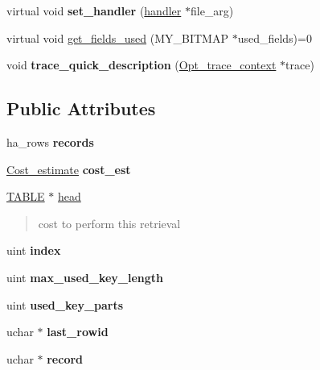 \begin{DoxyCompactItemize}
virtual void {\bfseries set\+\_\+handler} (\mbox{\hyperlink{classhandler}{handler}} $\ast$file\+\_\+arg)
\item 
virtual void \mbox{\hyperlink{classQUICK__SELECT__I_a369861adc70c029a3eb4134e8b7cce4f}{get\+\_\+fields\+\_\+used}} (M\+Y\+\_\+\+B\+I\+T\+M\+AP $\ast$used\+\_\+fields)=0
\item 
\mbox{\label{classQUICK__SELECT__I_a21e93e148e997f15a4708183118aaf48}} 
void {\bfseries trace\+\_\+quick\+\_\+description} (\mbox{\hyperlink{classOpt__trace__context}{Opt\+\_\+trace\+\_\+context}} $\ast$trace)
\end{DoxyCompactItemize}
\subsection*{Public Attributes}
\begin{DoxyCompactItemize}
\item 
\mbox{\label{classQUICK__SELECT__I_af94f0de82d880551e2ef9bf6b18f4947}} 
ha\+\_\+rows {\bfseries records}
\item 
\mbox{\label{classQUICK__SELECT__I_a8531d02b7cef8f9baf3ca77e3f292997}} 
\mbox{\hyperlink{classCost__estimate}{Cost\+\_\+estimate}} {\bfseries cost\+\_\+est}
\item 
\mbox{\label{classQUICK__SELECT__I_acea2f5e5b09be8e5b08680ae8a120481}} 
\mbox{\hyperlink{structTABLE}{T\+A\+B\+LE}} $\ast$ \mbox{\hyperlink{classQUICK__SELECT__I_acea2f5e5b09be8e5b08680ae8a120481}{head}}
\begin{DoxyCompactList}\small\item\em \begin{quote}
cost to perform this retrieval\end{quote}
\end{DoxyCompactList}\item 
\mbox{\label{classQUICK__SELECT__I_abc5c187ad183f87e5f78fe9083553882}} 
uint {\bfseries index}
\item 
\mbox{\label{classQUICK__SELECT__I_a302207a7362003edaeb5ded00f3ed6e5}} 
uint {\bfseries max\+\_\+used\+\_\+key\+\_\+length}
\item 
\mbox{\label{classQUICK__SELECT__I_aef8cc7444d715879a57468d0692ff7fe}} 
uint {\bfseries used\+\_\+key\+\_\+parts}
\item 
\mbox{\label{classQUICK__SELECT__I_aedf2c6f5671bf15b47f22971e215e47b}} 
uchar $\ast$ {\bfseries last\+\_\+rowid}
\item 
\mbox{\label{classQUICK__SELECT__I_a7c329627b00cffb3de53ebb9c11cee75}} 
uchar $\ast$ {\bfseries record}
\end{DoxyCompactItemize}


